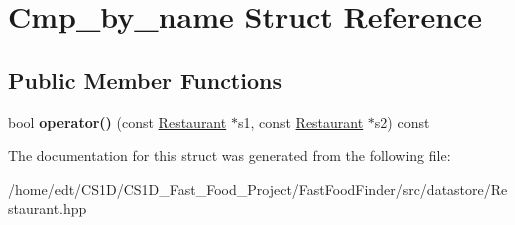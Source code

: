 \hypertarget{structCmp__by__name}{\section{Cmp\-\_\-by\-\_\-name Struct Reference}
\label{structCmp__by__name}
}
\subsection*{Public Member Functions}
\begin{DoxyCompactItemize}
\item 
\hypertarget{structCmp__by__name_a9118a502954850a1b036327f5e4d6b89}{bool {\bfseries operator()} (const \hyperlink{classRestaurant}{Restaurant} $\ast$s1, const \hyperlink{classRestaurant}{Restaurant} $\ast$s2) const }\label{structCmp__by__name_a9118a502954850a1b036327f5e4d6b89}

\end{DoxyCompactItemize}


The documentation for this struct was generated from the following file\-:\begin{DoxyCompactItemize}
\item 
/home/edt/\-C\-S1\-D/\-C\-S1\-D\-\_\-\-Fast\-\_\-\-Food\-\_\-\-Project/\-Fast\-Food\-Finder/src/datastore/Restaurant.\-hpp\end{DoxyCompactItemize}
